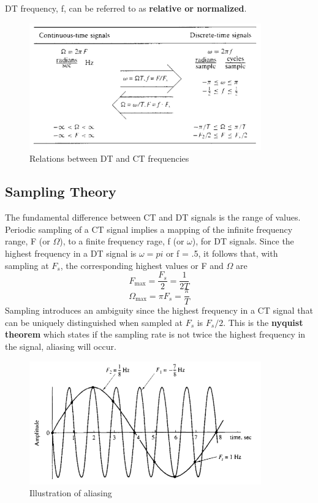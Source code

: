 \documentclass{article} %
\begin{document}
    DT frequency, f, can be referred to as \textbf{relative or normalized}.
    \begin{figure}[h]
    \centering
	\includegraphics[width=10cm]{freqs}
	\caption{Relations between DT and CT frequencies}
	\end{figure}
	
	\subsection{Sampling Theory}
	The fundamental difference between CT and DT signals is the range of values. Periodic sampling of a CT signal implies a mapping of the infinite frequency range, F (or $\Omega$), to a finite frequency rage, f (or $\omega$), for DT signals. Since the highest frequency in a DT signal is $\omega = pi$ or f = .5, it follows that, with sampling at $F_s$, the corresponding highest values or F and $\Omega$ are
	\begin{equation}  
	F_{\mathrm{max}} = \frac{F_s}{2} = \frac{1}{2T}
    \end{equation}
    \begin{equation}  
	\Omega_{\mathrm{max}} = \pi F_s = \frac{\pi}{T}
    \end{equation}
    Sampling introduces an ambiguity since the highest frequency in a CT signal that can be uniquely distinguished when sampled at $F_s$ is $F_s/2$. This is the \textbf{nyquist theorem} which states if the sampling rate is not twice the highest frequency in the signal, aliasing will occur.
    \begin{figure}[h]
    \centering
	\includegraphics[width=10cm]{alias}
	\caption{Illustration of aliasing}
	\end{figure}
    
    
\end{document}
